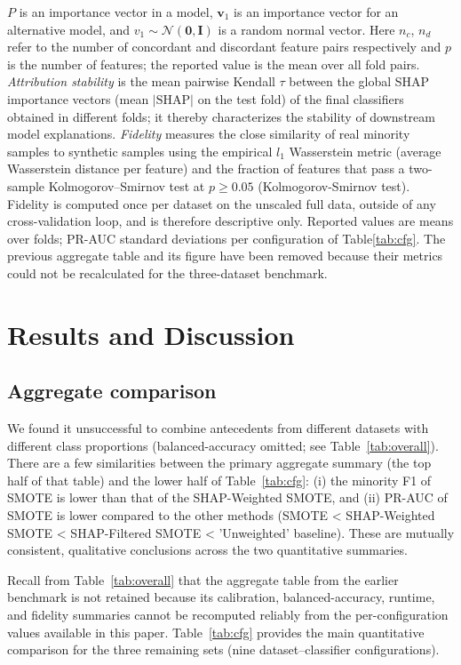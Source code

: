 \documentclass[conference]{IEEEtran}
\begin{document}
$P$ is an importance vector in a model, $\mathbf{v}_1$ is an importance vector for an alternative model, and $v_1 \sim \mathcal{N}(\mathbf{0}, \mathbf{I})$ is a random normal vector. Here $n_c$, $n_d$ refer to the number of concordant and discordant feature pairs respectively and $p$ is the number of features; the reported value is the mean over all fold pairs. \emph{Attribution stability} is the mean pairwise Kendall $\tau$ between the global SHAP importance vectors (mean $|\mathrm{SHAP}|$ on the test fold) of the final classifiers obtained in different folds; it thereby characterizes the stability of downstream model explanations. \emph{Fidelity} measures the close similarity of real minority samples to synthetic samples using the empirical $l_1$ Wasserstein metric (average Wasserstein distance per feature) and the fraction of features that pass a two-sample Kolmogorov–Smirnov test at $p\ge 0.05$ (Kolmogorov-Smirnov test). Fidelity is computed once per dataset on the unscaled full data, outside of any cross-validation loop, and is therefore descriptive only. Reported values are means over folds; PR-AUC standard deviations per configuration of Table\ref{tab:cfg}. The previous aggregate table and its figure have been removed because their metrics could not be recalculated for the three-dataset benchmark. 

\section{Results and Discussion}
\subsection{Aggregate comparison}
We found it unsuccessful to combine antecedents from different datasets with different class proportions (balanced-accuracy omitted; see Table~\ref{tab:overall}). There are a few similarities between the primary aggregate summary (the top half of that table) and the lower half of Table~\ref{tab:cfg}: (i) the minority F1 of SMOTE is lower than that of the SHAP-Weighted SMOTE, and (ii) PR-AUC of SMOTE is lower compared to the other methods (SMOTE < SHAP-Weighted SMOTE < SHAP-Filtered SMOTE < 'Unweighted' baseline). These are mutually consistent, qualitative conclusions across the two quantitative summaries.\

Recall from Table~\ref{tab:overall} that the aggregate table from the earlier benchmark is not retained because its calibration, balanced-accuracy, runtime, and fidelity summaries cannot be recomputed reliably from the per-configuration values available in this paper. Table~\ref{tab:cfg} provides the main quantitative comparison for the three remaining sets (nine dataset--classifier configurations).
\end{document}
